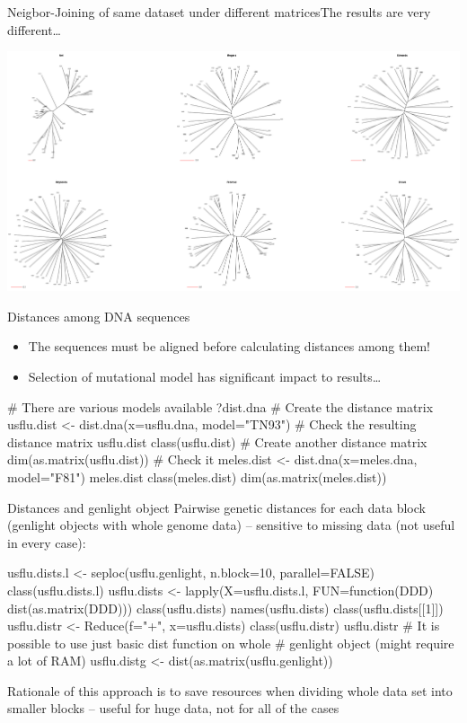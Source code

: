 \documentclass[compress, ucs, xelatex, 11pt, xcolor=svgnames,
  hyperref={
    bookmarks=true,
    unicode=true,
    colorlinks=true,
    pdftitle={Molecular data in R},
    plainpages=false,
    pdfauthor={Vojtech Zeisek},
    pdfsubject={Course about phylogeny and evolution in R},
    pdfcreator={XeLaTeX},
    pdfkeywords={R, evolution, phylogeny, molecular data},
    linkcolor=Tomato,
    anchorcolor=SaddleBrown,
    citecolor=Goldenrod,
    filecolor=DarkMagenta,
    menucolor=Sienna,
    urlcolor=DarkTurquoise,
    pdftex},
  url={hyphens, lowtilde} %
  ]{beamer}
\begin{document}
\begin{frame}{Neigbor-Joining of same dataset under different matrices}{The results are very different\ldots}
  \begin{center}
    \includegraphics[width=\textwidth]{distances.png}
  \end{center}
\end{frame}

\begin{frame}[fragile]{Distances among DNA sequences}
  \begin{itemize}
    \item \alert{The sequences must be aligned before calculating distances among them!}
    \item Selection of mutational model has significant impact to results\ldots
  \end{itemize}
  \vfill
  \begin{spluscode}
    # There are various models available
    ?dist.dna
    # Create the distance matrix
    usflu.dist <- dist.dna(x=usflu.dna, model="TN93")
    # Check the resulting distance matrix
    usflu.dist
    class(usflu.dist)
    # Create another distance matrix
    dim(as.matrix(usflu.dist))
    # Check it
    meles.dist <- dist.dna(x=meles.dna, model="F81")
    meles.dist
    class(meles.dist)
    dim(as.matrix(meles.dist))
  \end{spluscode}
\end{frame}

\begin{frame}[fragile]{Distances and genlight object}
  \vfill
  Pairwise genetic distances for each data block (genlight objects with whole genome data) -- sensitive to missing data (not useful in every case):
  \vfill
  \begin{spluscode}
    usflu.dists.l <- seploc(usflu.genlight, n.block=10, parallel=FALSE)
    class(usflu.dists.l)
    usflu.dists <- lapply(X=usflu.dists.l, FUN=function(DDD)
      dist(as.matrix(DDD)))
    class(usflu.dists)
    names(usflu.dists)
    class(usflu.dists[[1]])
    usflu.distr <- Reduce(f="+", x=usflu.dists)
    class(usflu.distr)
    usflu.distr
    # It is possible to use just basic dist function on whole
    # genlight object (might require a lot of RAM)
    usflu.distg <- dist(as.matrix(usflu.genlight))
  \end{spluscode}
  \vfil
  Rationale of this approach is to save resources when dividing whole data set into smaller blocks -- useful for huge data, not for all of the cases
  \vfill
\end{frame}
\end{document}
